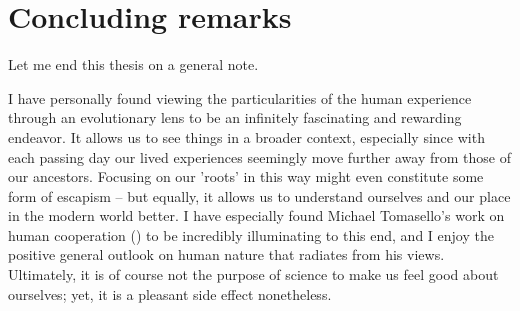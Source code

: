\section*{Concluding remarks}

Let me end this thesis on a general note.

I have personally found viewing the particularities of the human experience through an evolutionary lens to be an infinitely fascinating and rewarding endeavor. It allows us to see things in a broader context, especially since with each passing day our lived experiences seemingly move further away from those of our ancestors. Focusing on our 'roots' in this way might even constitute some form of escapism -- but equally, it allows us to understand ourselves and our place in the modern world better.
I have especially found Michael Tomasello's work on human cooperation (\citeyear{Tomasello09}) to be incredibly illuminating to this end, and I enjoy the positive general outlook on human nature that radiates from his views. Ultimately, it is of course not the purpose of science to make us feel good about ourselves; yet, it is a pleasant side effect nonetheless.
